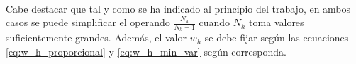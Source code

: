\documentclass{article}
\begin{document}
  \paragraph{}
  Cabe destacar que tal y como se ha indicado al principio del trabajo, en ambos casos se puede simplificar el operando $\frac{N_h}{N_h-1}$ cuando $N_h$ toma valores suficientemente grandes. Además, el valor $w_h$ se debe fijar según las ecuaciones \eqref{eq:w_h_proporcional} y \eqref{eq:w_h_min_var} según corresponda.


  \nocite{muest2017}
  \nocite{sarndal2003model}

  
  
\end{document}
